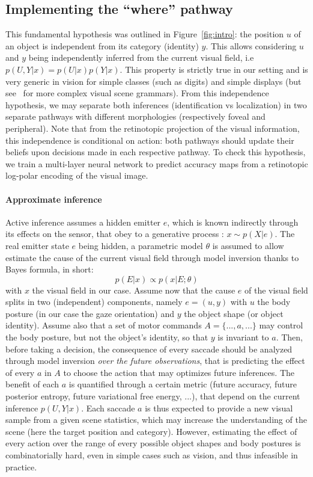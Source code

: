 \subsection{Implementing the ``where'' pathway}

This fundamental hypothesis was outlined in Figure~\ref{fig:intro}: the position $u$ of an object is independent from its category (identity) $y$. This allows considering $u$ and $y$ being independently inferred from the current visual field, i.e $p(U,Y|x) = p(U|x) p(Y|x)$. This property is strictly true in our setting and is very generic in vision for simple classes (such as digits) and simple displays (but see~\citep{Vo12} for more complex visual scene grammars). 
From this independence hypothesis, we may separate both inferences (identification vs localization) in two separate pathways with different morphologies (respectively foveal and peripheral). Note that from the retinotopic projection of the visual information, this independence is conditional on action: both pathways should update their beliefs upon decisions made in each respective pathway.
To check this hypothesis, we train a multi-layer neural network to predict accuracy maps from a retinotopic log-polar encoding of the visual image. 


\paragraph{Approximate inference}
Active inference assumes a hidden emitter $e$, which is known indirectly through its effects on the sensor, that obey to a generative process : $x\sim p(X|e)$. The real emitter state $e$ being hidden, a parametric model $\theta$ is assumed to allow estimate the cause of the current visual field through model inversion thanks to Bayes formula, in short:
$$p(E|x) \propto p(x|E;\theta)$$
with $x$ the visual field in our case. Assume now that the cause $e$ of the visual field splits in two (independent) components, namely $e = (u,y)$ with $u$ the body posture (in our case the gaze orientation) and $y$ the object shape (or object identity). Assume also that a set of motor commands $A = \{..., a, ...\}$ may control the body posture, but not the object's identity, so that $y$ is invariant to $a$.
Then, before taking a decision, the consequence of every saccade should be analyzed through model inversion \emph{over the future observations}, that is predicting the effect of every $a$ in $A$ to choose the action that may optimizes future inferences. The benefit of each $a$ is quantified through a certain metric (future accuracy, future posterior entropy, future variational free energy, ...), that depend on the current inference $p(U,Y|x)$. Each saccade $a$ is thus expected to provide a new visual sample from a given scene statistics, which may increase the understanding of the scene (here the target position and category). However, estimating the effect of every action over the range of every possible object shapes and body postures is combinatorially hard, even in simple cases such as vision, and thus infeasible in practice. 





